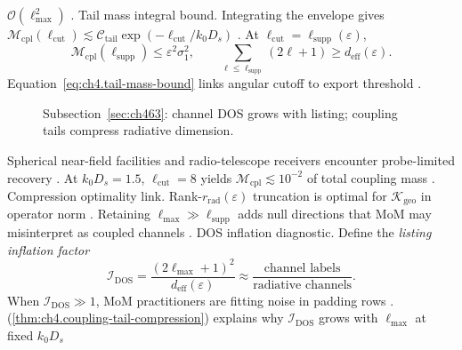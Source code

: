 \(\mathcal{O}(\ell_{\max}^{2})\) \cite{hansen1988}.
Tail mass integral bound. Integrating the envelope gives \(\mathcal{M}_{\mathrm{cpl}}(\ell_{\mathrm{cut}})\lesssim\mathcal{C}_{\mathrm{tail}}\exp(-\ell_{\mathrm{cut}}/k_{0}D_{s})\)
\cite{hansen1988}. At \(\ell_{\mathrm{cut}}=\ell_{\mathrm{supp}}(\varepsilon)\),
\begin{equation}
\label{eq:ch4.tail-mass-bound}
\mathcal{M}_{\mathrm{cpl}}(\ell_{\mathrm{supp}})\le\varepsilon^{2}\sigma_{1}^{2},\qquad
\sum_{\ell\le\ell_{\mathrm{supp}}}(2\ell+1)\ge d_{\mathrm{eff}}(\varepsilon).
\end{equation}
Equation~\eqref{eq:ch4.tail-mass-bound} links angular cutoff to export threshold \cite{harrington2001}.
\begin{figure}[t]
\centering
{}
\caption{Subsection~\ref{sec:ch463}: channel DOS grows with listing; coupling tails compress radiative dimension.}
\label{fig:ch4.coupling-tail-compression}
\end{figure}
Spherical near-field facilities and radio-telescope receivers encounter probe-limited recovery \cite{hansen1988}.
At \(k_{0}D_{s}=1.5\), \(\ell_{\mathrm{cut}}=8\) yields \(\mathcal{M}_{\mathrm{cpl}}\lesssim10^{-2}\) of total coupling mass
\cite{hansen1988}.
Compression optimality link. Rank-\(r_{\mathrm{rad}}(\varepsilon)\) truncation is optimal for \(\boldsymbol{\mathcal{K}}_{\mathrm{geo}}\) in operator norm
\cite{harrington2001}. Retaining \(\ell_{\max}\gg\ell_{\mathrm{supp}}\) adds null directions that MoM may misinterpret as
coupled channels \cite{stratton1941}.
DOS inflation diagnostic. Define the \emph{listing inflation factor}
\begin{equation}
\label{eq:ch4.dos-inflation}
\mathcal{I}_{\mathrm{DOS}}
=
\frac{(2\ell_{\max}+1)^{2}}{d_{\mathrm{eff}}(\varepsilon)}
\approx
\frac{\text{channel labels}}{\text{radiative channels}}.
\end{equation}
When \(\mathcal{I}_{\mathrm{DOS}}\gg1\), MoM practitioners are fitting noise in padding rows \cite{harrington2001}.
(\ref{thm:ch4.coupling-tail-compression}) explains why \(\mathcal{I}_{\mathrm{DOS}}\) grows with \(\ell_{\max}\) at fixed \(k_{0}D_{s}\)
